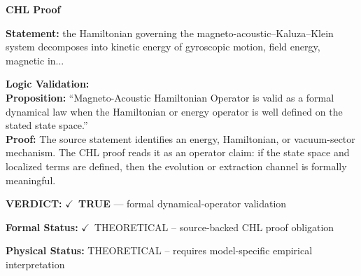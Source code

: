 \vspace{0.45em}
\noindent\textbf{CHL Proof}\par
\textbf{Statement:} the Hamiltonian governing the magneto-acoustic--Kaluza--Klein system decomposes into
kinetic energy of gyroscopic motion, field energy, magnetic in...

\textbf{Logic Validation:}\\
\textbf{Proposition:} ``Magneto-Acoustic Hamiltonian Operator is valid as a formal dynamical law when the
Hamiltonian or energy operator is well defined on the stated state space.''\\
\textbf{Proof:} The source statement identifies an energy, Hamiltonian, or vacuum-sector mechanism. The
CHL proof reads it as an operator claim: if the state space and localized terms are
defined, then the evolution or extraction channel is formally meaningful.

\textbf{VERDICT:} \ensuremath{\checkmark}\ \textbf{TRUE} --- formal dynamical-operator validation

\textbf{Formal Status:} \ensuremath{\checkmark}\ THEORETICAL -- source-backed CHL proof obligation

\textbf{Physical Status:} THEORETICAL -- requires model-specific empirical interpretation
\par\vspace{0.45em}
\par
\ifTZPDarkEdition
{}
\fi
\endgroup
\endgroup
